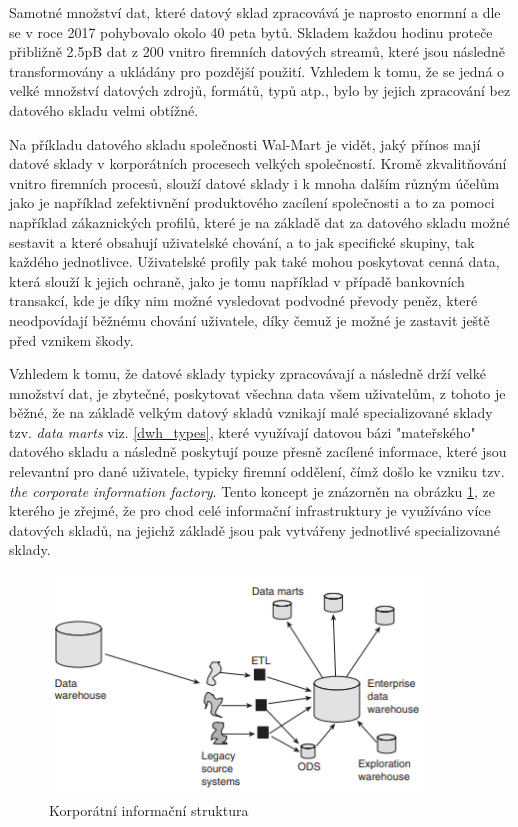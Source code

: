 \documentclass[
  digital,     %
  twoside,     %
  lof,         %
  lot,         %
]{fithesis4}
\begin{document}
Samotné množství dat, které datový sklad zpracovává je naprosto enormní a dle \citeauthor{Marr2017} se v roce 2017 pohybovalo okolo 40 peta bytů. Skladem každou hodinu proteče přibližně 2.5pB dat z 200 vnitro firemních datových streamů, které jsou následně transformovány a ukládány pro pozdější použití.\parencite{Marr2017} Vzhledem k tomu, že se jedná o velké množství datových zdrojů, formátů, typů atp., bylo by jejich zpracování bez datového skladu velmi obtížné.

Na příkladu datového skladu společnosti Wal-Mart je vidět, jaký přínos mají datové sklady v korporátních procesech velkých společností. Kromě zkvalitňování vnitro firemních procesů, slouží datové sklady i k mnoha dalším různým účelům jako je například zefektivnění produktového zacílení společnosti a to za pomoci například zákaznických profilů, které je na základě dat za datového skladu možné sestavit a které obsahují uživatelské chování, a to jak specifické skupiny, tak každého jednotlivce. Uživatelské profily pak také mohou poskytovat cenná data, která slouží k jejich ochraně, jako je tomu například v případě bankovních transakcí, kde je díky nim možné vysledovat podvodné převody peněz, které neodpovídají běžnému chování uživatele, díky čemuž je možné je zastavit ještě před vznikem škody.\parencite{Inmon2008}


Vzhledem k tomu, že datové sklady typicky zpracovávají a následně drží velké množství dat, je zbytečné, poskytovat všechna data všem uživatelům, z tohoto je běžné, že na základě velkým datový skladů vznikají malé specializované sklady tzv. \emph{data marts} viz. \ref{dwh_types}, které využívají datovou bázi "mateřského" datového skladu a následně poskytují pouze přesně zacílené informace, které jsou relevantní pro dané uživatele, typicky firemní oddělení, čímž došlo ke vzniku tzv. \emph{the corporate information factory}.\parencite{Inmon2021} Tento koncept je znázorněn na obrázku \ref{fig:data_marts_schema}, ze kterého je zřejmé, že pro chod celé informační infrastruktury je využíváno více datových skladů, na jejichž základě jsou pak vytvářeny jednotlivé specializované sklady.


\begin{figure}[h]
  \begin{center}
          \includegraphics[width=10cm]{img/data_marts_schema.png}
  \end{center}
  \caption{Korporátní informační struktura \parencite[s.12]{Inmon2008}}
  \label{fig:data_marts_schema}
\end{figure}  
\end{document}
